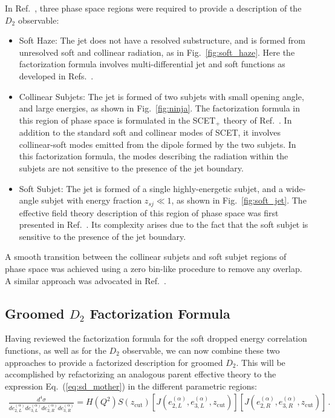 \documentclass[a4paper,11pt]{article}
\newcommand{\ecf}[2]{e_{#1}^{(#2)}}
\def\zcut{z_{\text{cut}}}
\DeclareRobustCommand{\Fig}[1]{Fig.~\ref{#1}}
\DeclareRobustCommand{\Eq}[1]{Eq.~(\ref{#1})}
\DeclareRobustCommand{\Ref}[1]{Ref.~\cite{#1}}
\DeclareRobustCommand{\Refs}[1]{Refs.~\cite{#1}}
\begin{document}
In \Ref{Larkoski:2015kga}, three phase space regions were required to provide a description of the $D_2$ observable:
\begin{itemize}
\item Soft Haze: The jet does not have a resolved substructure, and is formed from unresolved soft and collinear radiation, as in \Fig{fig:soft_haze}. Here the factorization formula involves multi-differential jet and soft functions as developed in \Refs{Larkoski:2014tva,Procura:2014cba,Lustermans:2016nvk}.

\item Collinear Subjets: The jet is formed of two subjets with small opening angle, and large energies, as shown in \Fig{fig:ninja}. The factorization formula in this region of phase space is formulated in the SCET$_+$ theory of \Ref{Bauer:2011uc}. In addition to the standard soft and collinear modes of SCET, it involves collinear-soft modes emitted from the dipole formed by the two subjets. In this factorization formula, the modes describing the radiation within the subjets are not sensitive to the presence of the jet boundary.

\item Soft Subjet: The jet is formed of a single highly-energetic subjet, and a wide-angle subjet with energy fraction $z_{sj}\ll 1$, as shown in \Fig{fig:soft_jet}. The effective field theory description of this region of phase space was first presented in \Ref{Larkoski:2015zka}. Its complexity arises due to the fact that the soft subjet is sensitive to the presence of the jet boundary.

\end{itemize}
%
A smooth transition between the collinear subjets and soft subjet regions of phase space was achieved using a zero bin-like procedure to remove any overlap. A similar approach was advocated in \Ref{Pietrulewicz:2016nwo}. 


\subsection{Groomed $D_2$ Factorization Formula}\label{sec:fact_D2}

Having reviewed the factorization formula for the soft dropped energy correlation functions, as well as for the $D_2$ observable, we can now combine these two approaches to provide a factorized description for groomed $D_2$. This will be accomplished by refactorizing an analogous parent effective theory to the expression \Eq{eq:sd_mother} in the different parametric regions:
\begin{align}\label{eq:sd_mother_D2}
\frac{d^4\sigma}{d\ecf{2,L}{\alpha}d\ecf{3,L}{\alpha} d\ecf{2,R}{\alpha}d\ecf{3,R}{\alpha} }= H(Q^2) S(\zcut) \left[ J(\ecf{2,L}{\alpha},\ecf{3,L}{\alpha},\zcut)  \right]\left[ J(\ecf{2,R}{\alpha},\ecf{3,R}{\alpha},\zcut)  \right]\,.
\end{align}
\end{document}
